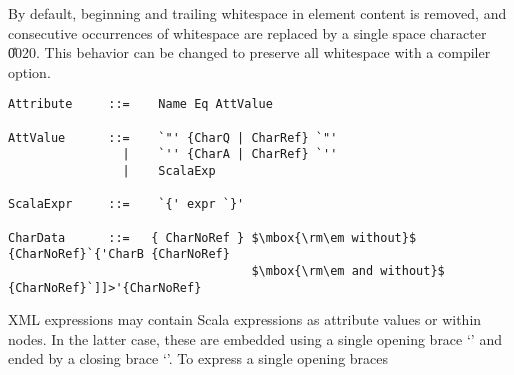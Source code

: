 By default, beginning and trailing whitespace in element content is removed, 
and consecutive occurrences of whitespace are replaced by a single space
character \U{0020}. This behavior can be changed to preserve all whitespace
with a compiler option.
\syntax\begin{lstlisting}
Attribute     ::=    Name Eq AttValue                                    

AttValue      ::=    `"' {CharQ | CharRef} `"'
                |    `'' {CharA | CharRef} `''
                |    ScalaExp

ScalaExpr     ::=    `{' expr `}'

CharData      ::=   { CharNoRef } $\mbox{\rm\em without}$ {CharNoRef}`{'CharB {CharNoRef} 
                                  $\mbox{\rm\em and without}$ {CharNoRef}`]]>'{CharNoRef}
\end{lstlisting}
XML expressions may contain Scala expressions as attribute values or
within nodes. In the latter case, these are embedded using a single opening 
brace `{' and ended by a closing brace `}'. To express a single opening braces 
